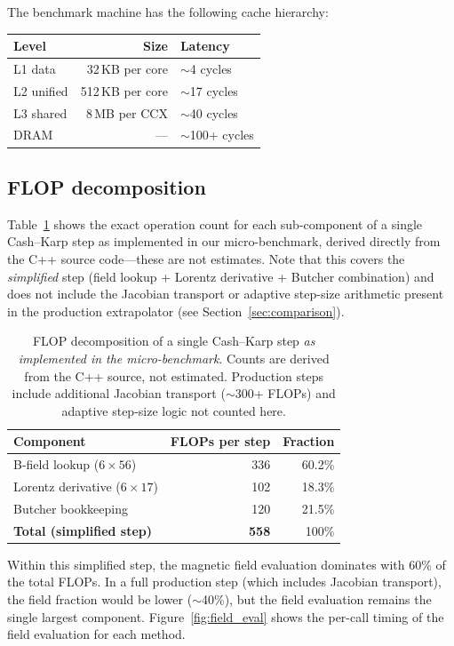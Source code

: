 \documentclass[11pt,a4paper]{article}
\begin{document}
The benchmark machine has the following cache hierarchy:
\begin{center}
\begin{tabular}{lrl}
\toprule
Level & Size & Latency \\
\midrule
L1 data & 32\,KB per core & $\sim$4 cycles \\
L2 unified & 512\,KB per core & $\sim$17 cycles \\
L3 shared & 8\,MB per CCX & $\sim$40 cycles \\
DRAM & --- & $\sim$100+ cycles \\
\bottomrule
\end{tabular}
\end{center}


\subsection{FLOP decomposition}
\label{sec:flops}

Table~\ref{tab:flop_breakdown} shows the exact operation count for
each sub-component of a single Cash--Karp step as implemented in
our micro-benchmark, derived directly from the C++ source code---these
are not estimates.  Note that this covers the \emph{simplified} step
(field lookup + Lorentz derivative + Butcher combination) and does
not include the Jacobian transport or adaptive step-size arithmetic
present in the production extrapolator (see
Section~\ref{sec:comparison}).

\begin{table}[htbp]
\centering
\caption{FLOP decomposition of a single Cash--Karp step \emph{as
implemented in the micro-benchmark}.  Counts are derived from the C++
source, not estimated.  Production steps include additional Jacobian
transport ($\sim$300+ FLOPs) and adaptive step-size logic not counted
here.}
\label{tab:flop_breakdown}
\begin{tabular}{lrr}
\toprule
Component & FLOPs per step & Fraction \\
\midrule
B-field lookup ($6 \times 56$) & 336 & 60.2\% \\
Lorentz derivative ($6 \times 17$) & 102 & 18.3\% \\
Butcher bookkeeping & 120 & 21.5\% \\
\midrule
\textbf{Total (simplified step)} & \textbf{558} & 100\% \\
\bottomrule
\end{tabular}
\end{table}

Within this simplified step, the magnetic field evaluation dominates
with 60\% of the total FLOPs.  In a full production step (which
includes Jacobian transport), the field fraction would be lower
($\sim$40\%), but the field evaluation remains the single largest
component.
Figure~\ref{fig:field_eval} shows the per-call timing of the
field evaluation for each method.
\end{document}
